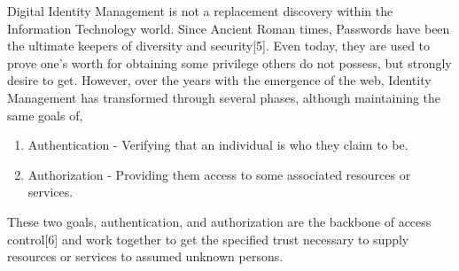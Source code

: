 Digital Identity Management is not a replacement discovery within the Information Technology world. Since Ancient Roman times, Passwords have been the ultimate keepers of diversity and
security[5]. Even today, they are used to prove one’s worth for obtaining some privilege others do not possess, but strongly desire to get. However, over the years with the emergence of the web, Identity Management has transformed through several phases, although maintaining the same goals of,

\begin{enumerate}
    \item Authentication - Verifying that an individual is who they claim to be.
    \item Authorization - Providing them access to some associated resources or services.
\end{enumerate}

These two goals, authentication, and authorization are the backbone of access control[6] and work together to get the specified trust necessary to supply resources or services to assumed unknown persons. 


